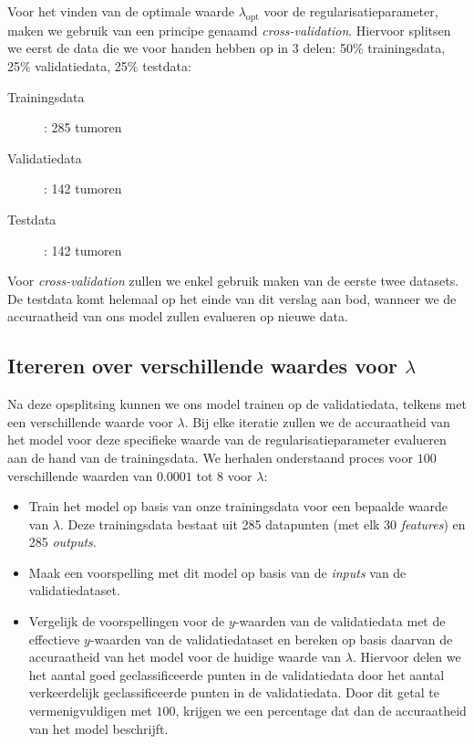 \documentclass[twoside, kulak]{kulakreport}
\begin{document}
	Voor het vinden van de optimale waarde \(\lambda_{\text{opt}}\) voor de regularisatieparameter, maken we gebruik van een principe genaamd \textit{cross-validation}. Hiervoor splitsen we eerst de data die we voor handen hebben op in 3 delen: 50\% trainingsdata, 25\% validatiedata, 25\% testdata:
	
	\begin{description}
		\item [Trainingsdata]: 285 tumoren
		\item [Validatiedata]: 142 tumoren
		\item [Testdata]: 142 tumoren
	\end{description}
	
	Voor \textit{cross-validation} zullen we enkel gebruik maken van de eerste twee datasets. De testdata komt helemaal op het einde van dit verslag aan bod, wanneer we de accuraatheid van ons model zullen evalueren op nieuwe data.
	
	\subsection{Itereren over verschillende waardes voor \(\lambda\)}
	
	Na deze opsplitsing kunnen we ons model trainen op de validatiedata, telkens met een verschillende waarde voor \(\lambda\). Bij elke iteratie zullen we de accuraatheid van het model voor deze specifieke waarde van de regularisatieparameter evalueren aan de hand van de trainingsdata. We herhalen onderstaand proces voor \(100\) verschillende waarden van \(0.0001\) tot \(8\) voor \(\lambda\):
	
	\begin{itemize}
		\item Train het model op basis van onze trainingsdata voor een bepaalde waarde van \(\lambda\). Deze trainingsdata bestaat uit 285 datapunten (met elk 30 \textit{features}) en 285 \textit{outputs}.
		\item Maak een voorspelling met dit model op basis van de \textit{inputs} van de validatiedataset.
		\item Vergelijk de voorspellingen voor de \(y\)-waarden van de validatiedata met de effectieve \(y\)-waarden van de validatiedataset en bereken op basis daarvan de accuraatheid van het model voor de huidige waarde van \(\lambda\). Hiervoor delen we het aantal goed geclassificeerde punten in de validatiedata door het aantal verkeerdelijk geclassificeerde punten in de validatiedata. Door dit getal te vermenigvuldigen met \(100\), krijgen we een percentage dat dan de accuraatheid van het model beschrijft.
	\end{itemize}
	
\end{document}
